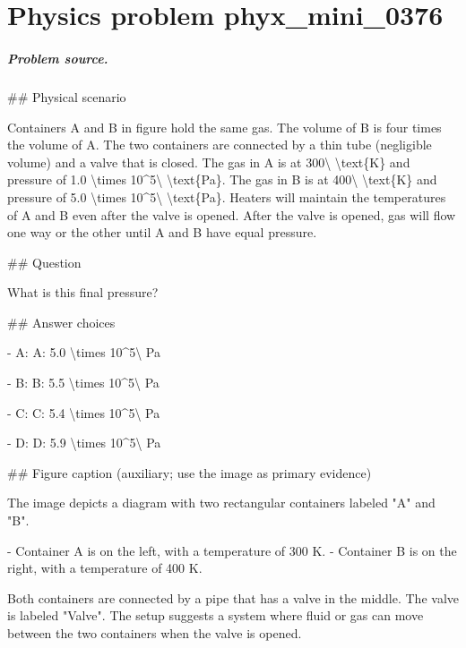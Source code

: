 
\chapter{Physics problem phyx\_mini\_0376}
\label{ch:PhyXMiniProblems_problem_phyx_mini_0376}

\paragraph{Problem source.}
\#\# Physical scenario

Containers A and B in figure hold the same gas. The volume of B is four times the volume of A. The two containers are connected by a thin tube (negligible volume) and a valve that is closed. The gas in A is at 300\textbackslash{} \textbackslash{}text\{K\} and pressure of 1.0 \textbackslash{}times 10\textasciicircum{}5\textbackslash{} \textbackslash{}text\{Pa\}. The gas in B is at 400\textbackslash{} \textbackslash{}text\{K\} and pressure of 5.0 \textbackslash{}times 10\textasciicircum{}5\textbackslash{} \textbackslash{}text\{Pa\}. Heaters will maintain the temperatures of A and B even after the valve is opened. After the valve is opened, gas will flow one way or the other until A and B have equal pressure.

\#\# Question

What is this final pressure?

\#\# Answer choices

- A: A: 5.0 \textbackslash{}times 10\textasciicircum{}5\textbackslash{} Pa

- B: B: 5.5 \textbackslash{}times 10\textasciicircum{}5\textbackslash{} Pa

- C: C: 5.4 \textbackslash{}times 10\textasciicircum{}5\textbackslash{} Pa

- D: D: 5.9 \textbackslash{}times 10\textasciicircum{}5\textbackslash{} Pa

\#\# Figure caption (auxiliary; use the image as primary evidence)

The image depicts a diagram with two rectangular containers labeled "A" and "B". 

- Container A is on the left, with a temperature of 300 K. 
- Container B is on the right, with a temperature of 400 K. 

Both containers are connected by a pipe that has a valve in the middle. The valve is labeled "Valve". The setup suggests a system where fluid or gas can move between the two containers when the valve is opened.

